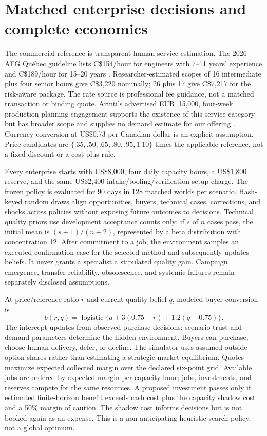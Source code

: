 \section{Matched enterprise decisions and complete economics}
\label{sec:methods-economics}

The commercial reference is transparent human-service estimation. The 2026 AFG Qu\'ebec guideline lists C\$154/hour for engineers with 7--11 years' experience and C\$189/hour for 15--20 years \cite{afg2026fees}. Researcher-estimated scopes of 16 intermediate plus four senior hours give C\$3,220 nominally; 26 plus 17 give C\$7,217 for the risk-aware package. The rate source is professional fee guidance, not a matched transaction or binding quote. Arinti's advertised EUR~15,000, four-week production-planning engagement supports the existence of this service category but has broader scope and supplies no demand estimate for our offering \cite{arinti2026planning}. Currency conversion at US\$0.73 per Canadian dollar is an explicit assumption. Price candidates are $\{.35,.50,.65,.80,.95,1.10\}$ times the applicable reference, not a fixed discount or a cost-plus rule.

Every enterprise starts with US\$8,000, four daily capacity hours, a US\$1,800 reserve, and the same US\$2,400 intake/tooling/verification setup charge. The frozen policy is evaluated for 90 days in 128 matched worlds per scenario. Hash-keyed random draws align opportunities, buyers, technical cases, corrections, and shocks across policies without exposing future outcomes to decisions. Technical quality priors use development acceptance counts only: if $s$ of $n$ cases pass, the initial mean is $(s+1)/(n+2)$, represented by a beta distribution with concentration 12. After commitment to a job, the environment samples an executed confirmation case for the selected method and subsequently updates beliefs. It never grants a specialist a stipulated quality gain. Campaign emergence, transfer reliability, obsolescence, and systemic failures remain separately disclosed assumptions.

At price/reference ratio $r$ and current quality belief $q$, modeled buyer conversion is
\begin{equation}
 b(r,q)=\operatorname{logistic}\{a+3(0.75-r)+1.2(q-0.75)\}.
\end{equation}
The intercept updates from observed purchase decisions; scenario trust and demand parameters determine the hidden environment. Buyers can purchase, choose human delivery, defer, or decline. The simulator uses assumed outside-option shares rather than estimating a strategic market equilibrium. Quotes maximize expected collected margin over the declared six-point grid. Available jobs are ordered by expected margin per capacity hour; jobs, investments, and reserves compete for the same resources. A proposed investment passes only if estimated finite-horizon benefit exceeds cash cost plus the capacity shadow cost and a 50\% margin of caution. The shadow cost informs decisions but is not booked again as an expense. This is a non-anticipating heuristic search policy, not a global optimum.


